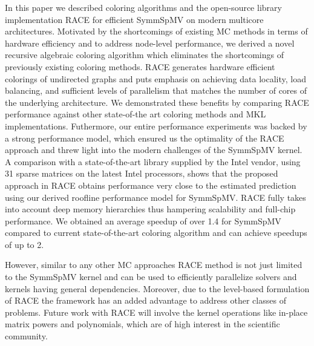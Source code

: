 In this paper we described coloring algorithms and the 
open-source library implementation \acrshort{RACE} for efficient \acrfull{SymmSpMV} on
modern multicore  architectures. Motivated by the shortcomings of existing \acrshort{MC} methods in  terms of hardware efficiency 
and to address node-level performance, we derived a novel recursive algebraic  coloring algorithm 
which eliminates the shortcomings of previously existing coloring methods.
\acrshort{RACE} generates hardware efficient \DK colorings of undirected graphs and puts 
emphasis on achieving data locality, load balancing, and sufficient levels of parallelism that matches the 
number of cores  of the underlying architecture. 
We demonstrated these benefits by comparing \acrshort{RACE} performance against other state-of-the art
coloring methods and  \acrshort{MKL} implementations. Futhermore, our entire performance experiments
was backed by a strong performance model,  which ensured us the optimality of the \acrshort{RACE} approach
and threw light into the modern challenges  of the \acrshort{SymmSpMV} kernel.
A comparison with a state-of-the-art library  supplied by the Intel vendor, using 31 sparse matrices 
on the latest Intel  processors, shows that the proposed approach in \acrshort{RACE}
obtains performance very close to the estimated prediction using our derived roofline performance model for 
\acrfull{SymmSpMV}. \acrshort{RACE} fully takes into account  deep memory hierarchies thus 
hampering scalability and full-chip performance.
 We obtained an average speedup of over 1.4 for \acrshort{SymmSpMV} compared to current 
state-of-the-art  coloring algorithm and can achieve speedups of up to 2.




However, similar to any other \acrshort{MC} approaches \acrshort{RACE} method 
is not just limited to the \acrshort{SymmSpMV} kernel
and can be used to efficiently parallelize solvers and kernels 
having general \DK dependencies. Moreover, due to the level-based formulation
of \acrshort{RACE} the framework has an added advantage to address 
other classes of problems. Future work with \acrshort{RACE} will involve the
kernel operations like in-place matrix powers and polynomials, which are of 
high interest in the scientific community. 



